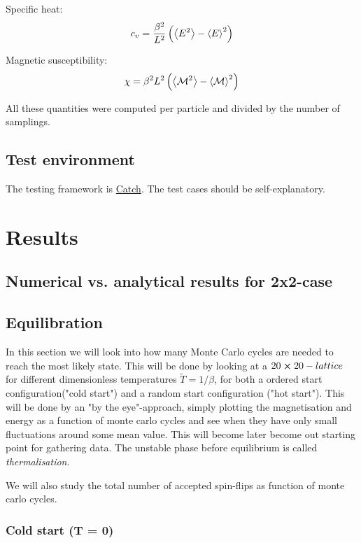 \documentclass[11pt,a4paper,english]{article}
\numberwithin{equation}{section}
\newcommand{\magM}{\mathcal{M}}
\begin{document}
Specific heat:
\begin{equation}
c_v = \frac{\beta^2}{L^2}\left(\expval{E^2} - \expval{E}^2\right)
\end{equation}

Magnetic susceptibility:
\begin{equation}
\chi = \beta^2 L^2 \left(\expval{\magM^2} - \expval{\magM}^2\right)
\end{equation}

All these quantities were computed per particle and divided by the number 
of samplings.

\subsection{Test environment}

The testing framework is \href{https://github.com/philsquared/Catch}{Catch}.
The test cases should be self-explanatory.


\section{Results}

\subsection{Numerical vs. analytical results for 2x2-case}

\subsection{Equilibration}
In this section we will look into how many Monte Carlo cycles are needed to reach the most likely state. This will be done by looking at a $20 \cross 20-lattice$ for different dimensionless temperatures $\tilde{T}=1/\beta$, for both a ordered start configuration("cold start") and a random start configuration ("hot start"). This will be done by an "by the eye"-approach, simply plotting the magnetisation and energy as a function of monte carlo cycles and see when they have only small fluctuations around some mean value. This will become later become out starting point for gathering data. The unstable phase before equilibrium is called \emph{thermalisation}.

We will also study the total number of accepted spin-flips as function of monte carlo cycles.

\subsubsection{Cold start (T = 0)}
\end{document}
